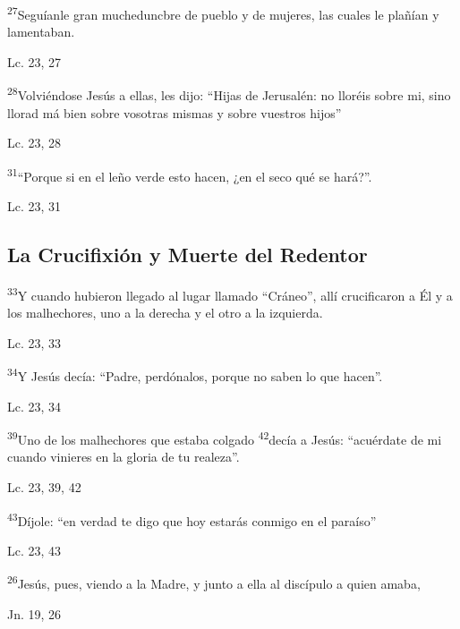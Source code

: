 \documentclass[a4paper,11pt]{article}
\begin{document}
      \textsuperscript{27}Seguíanle gran mucheduncbre de pueblo y de mujeres, las cuales le plañían y lamentaban.
      \begin{flushright}
        Lc. 23, 27
      \end{flushright}

      \textsuperscript{28}Volviéndose Jesús a ellas, les dijo: ``Hijas de Jerusalén: no lloréis sobre mi, sino llorad má bien sobre vosotras mismas y sobre
      vuestros hijos''
      \begin{flushright}
        Lc. 23, 28
      \end{flushright}

      \textsuperscript{31}``Porque si en el leño verde esto hacen, ¿en el seco qué se hará?''.
      \begin{flushright}
        Lc. 23, 31
      \end{flushright}

    \subsection*{\hfil La Crucifixión y Muerte del Redentor \hfil}
      
      \textsuperscript{33}Y cuando hubieron llegado al lugar llamado ``Cráneo'', allí crucificaron a Él y a los malhechores, uno a la derecha y el otro a la izquierda.
      \begin{flushright}
        Lc. 23, 33
      \end{flushright}

      \textsuperscript{34}Y Jesús decía: ``Padre, perdónalos, porque no saben lo que hacen''.
      \begin{flushright}
        Lc. 23, 34
      \end{flushright}

      \textsuperscript{39}Uno de los malhechores que estaba colgado \textsuperscript{42}decía a Jesús: ``acuérdate de mi cuando vinieres en la gloria de tu realeza''.
      \begin{flushright}
        Lc. 23, 39, 42
      \end{flushright}

      \textsuperscript{43}Díjole: ``en verdad te digo que hoy estarás conmigo en el paraíso''
      \begin{flushright}
        Lc. 23, 43
      \end{flushright}

      \textsuperscript{26}Jesús, pues, viendo a la Madre, y junto a ella al discípulo a quien amaba,
      \begin{flushright}
        Jn. 19, 26
      \end{flushright}
\end{document}
